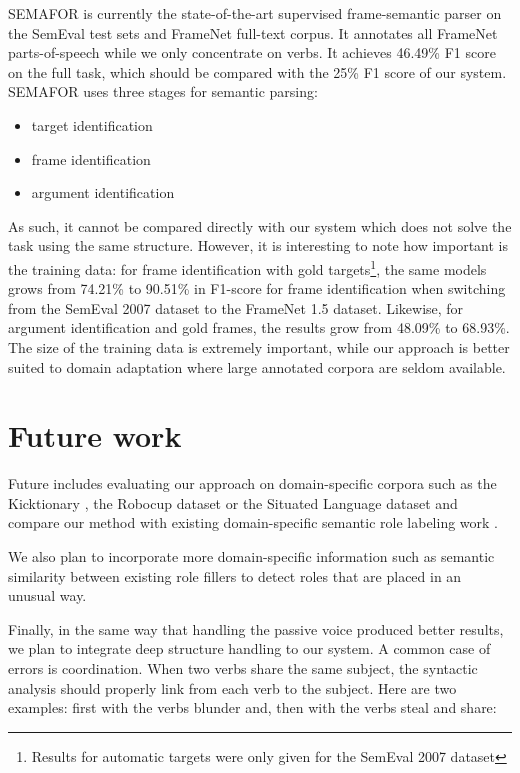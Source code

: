SEMAFOR \citep{das2013frame} is currently the state-of-the-art supervised
frame-semantic parser on the SemEval test sets and FrameNet full-text corpus.
It annotates all FrameNet parts-of-speech while we only concentrate on verbs.
It achieves 46.49\% F1 score on the full task, which should be compared with
the 25\% F1 score of our system.  SEMAFOR uses three stages for semantic
parsing:

\begin{itemize}
    \item target identification
    \item frame identification
    \item argument identification
\end{itemize}

As such, it cannot be compared directly with our system which does not solve
the task using the same structure. However, it is interesting to note how
important is the training data: for frame identification with gold
targets\footnote{Results for automatic targets were only given for the SemEval
2007 dataset}, the same models grows from 74.21\% to 90.51\% in F1-score for
frame identification when switching from the SemEval 2007 dataset to the
FrameNet 1.5 dataset. Likewise, for argument identification and gold
frames\footnotemark[\value{footnote}], the results grow from 48.09\% to
68.93\%. The size of the training data is extremely important, while our
approach is better suited to domain adaptation where large annotated corpora
are seldom available.

\section{Future work}

Future includes evaluating our approach on domain-specific corpora such as the
Kicktionary \citep{schmidt2009kicktionary}, the Robocup dataset
\citep{chen2008learning} or the Situated Language dataset
\citep{bordes2010towards} and compare our method with existing
domain-specific semantic role labeling work
\citep{wyner2010lexical,hadouche2011annotation,goldwasser2013leveraging}.

We also plan to incorporate more domain-specific information such as semantic
similarity between existing role fillers to detect roles that are placed in an
unusual way.

Finally, in the same way that handling the passive voice produced better
results, we plan to integrate deep structure handling to our system. A common
case of errors is coordination. When two verbs share the same subject, the
syntactic analysis should properly link from each verb to the subject. Here are
two examples: first with the verbs blunder and, then with the verbs steal and
share:

